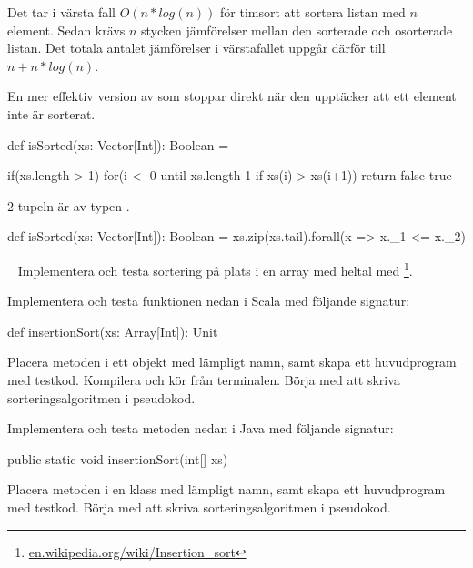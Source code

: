 \SOLUTION


\TaskSolved \what



\SubtaskSolved

Det tar i värsta fall $O(n*log(n))$ för timsort att sortera listan med $n$ element. Sedan krävs $n$ stycken jämförelser mellan den sorterade och osorterade listan. Det totala antalet jämförelser i värstafallet uppgår därför till $n + n*log(n)$.

\SubtaskSolved

En mer effektiv version av  som stoppar direkt när den upptäcker att ett element inte är sorterat.

\begin{Code}
def isSorted(xs: Vector[Int]): Boolean = {

  if(xs.length > 1){
    for(i <- 0 until xs.length-1 if xs(i) > xs(i+1)){
      return false
    }
  }
  true
}
\end{Code}

\SubtaskSolved

2-tupeln är av typen .

\begin{Code}
def isSorted(xs: Vector[Int]): Boolean =
  xs.zip(xs.tail).forall(x => x._1 <= x._2)
\end{Code}



\QUESTEND







\QUESTBEGIN

\Task  \what~ Implementera och testa sortering på plats i en array med heltal med \footnote{\href{https://en.wikipedia.org/wiki/Insertion_sort}{en.wikipedia.org/wiki/Insertion\_sort}}.

\Subtask Implementera och testa funktionen nedan i Scala med följande signatur:
\begin{Code}
  def insertionSort(xs: Array[Int]): Unit
\end{Code}
Placera metoden i ett objekt med lämpligt namn, samt skapa ett huvudprogram med testkod. Kompilera och kör från terminalen. Börja med att skriva sorteringsalgoritmen i pseudokod.

\Subtask Implementera och testa metoden nedan i Java med följande signatur:
\begin{Code}[language=Java]
  public static void insertionSort(int[] xs)
\end{Code}
Placera metoden i en klass med lämpligt namn, samt skapa ett huvudprogram med testkod. Börja med att skriva sorteringsalgoritmen i pseudokod.

